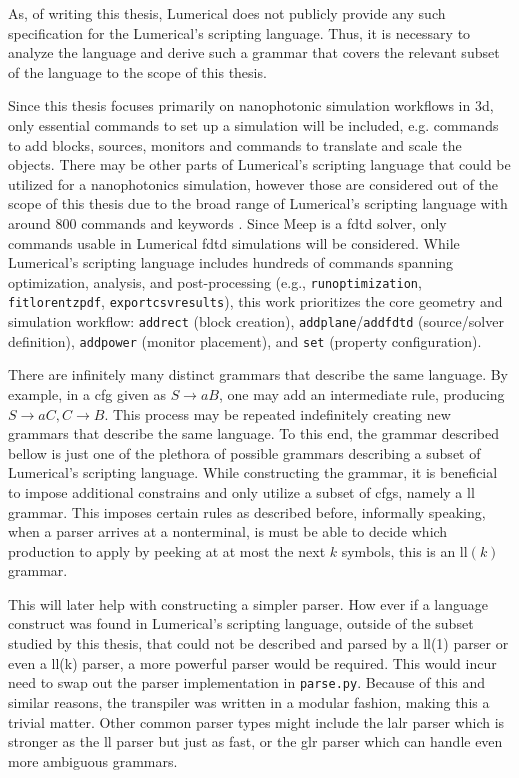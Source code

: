 As, of writing this thesis, Lumerical does not publicly provide any such specification for the Lumerical's scripting language. Thus, it is necessary to analyze the language and derive such a grammar that covers the relevant subset of the language to the scope of this thesis.

Since this thesis focuses primarily on nanophotonic simulation workflows in \gls{3d}, only essential commands to set up a simulation will be included, e.g. commands to add blocks, sources, monitors and commands to translate and scale the objects. There may be other parts of Lumerical's scripting language that could be utilized for a nanophotonics simulation, however those are considered out of the scope of this thesis due to the broad range of Lumerical's scripting language with around 800 commands and keywords \cite{ansys_lsf_commands}. Since Meep is a \gls{fdtd} solver, only commands usable in Lumerical \gls{fdtd} simulations will be considered.
While Lumerical’s scripting language includes hundreds of commands spanning optimization, analysis, and post-processing (e.g., \texttt{runoptimization}, \texttt{fitlorentzpdf}, \texttt{exportcsvresults}), this work prioritizes the core geometry and simulation workflow: \texttt{addrect} (block creation), \texttt{addplane}/\texttt{addfdtd} (source/solver definition), \texttt{addpower} (monitor placement), and \texttt{set} (property configuration). 


There are infinitely many distinct grammars that describe the same language. By example, in a \gls{cfg} given as $S \rightarrow aB$, one may add an intermediate rule, producing $S \rightarrow aC, C \rightarrow B$. This process may be repeated indefinitely creating new grammars that describe the same language. To this end, the grammar described bellow is just one of the plethora of possible grammars describing a subset of Lumerical's scripting language. While constructing the grammar, it is beneficial to impose additional constrains and only utilize a subset of \glspl{cfg}, namely a \gls{ll} grammar. This imposes certain rules as described before, informally speaking, when a parser arrives at a nonterminal, is must be able to decide which production to apply by peeking at at most the next $k$ symbols, this is an \gls{ll}$(k)$ grammar.

This will later help with constructing a simpler parser. How ever if a language construct was found in Lumerical's scripting language, outside of the subset studied by this thesis, that could not be described and parsed by a \gls{ll}(1) parser or even a \gls{ll}(k) parser, a more powerful parser would be required. This would incur need to swap out the parser implementation in \texttt{parse.py}. Because of this and similar reasons, the transpiler was written in a modular fashion, making this a trivial matter. Other common parser types might include the \gls{lalr} parser which is stronger as the \gls{ll} parser but just as fast, or the \gls{glr} parser which can handle even more ambiguous grammars.


